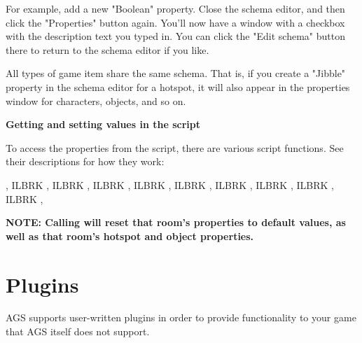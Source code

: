 For example, add a new "Boolean" property. Close the schema editor, and then click the
"Properties" button again. You'll now have a window with a checkbox with the description
text you typed in. You can click the "Edit schema" button there to return to the schema
editor if you like.

All types of game item share the same schema. That is, if you create a "Jibble" property
in the schema editor for a hotspot, it will also appear in the properties window for
characters, objects, and so on.

\bf{Getting and setting values in the script}

To access the properties from the script, there are various script functions. See
their descriptions for how they work:

,  ILBRK
,  ILBRK
,  ILBRK
,  ILBRK
,  ILBRK
,  ILBRK
,  ILBRK
,  ILBRK
,  ILBRK
,  

\bf{NOTE:} Calling  will reset that room's properties to default values, as well as that room's
hotspot and object properties.

\section{Plugins}%

AGS supports user-written plugins in order to provide functionality to your game
that AGS itself does not support.

